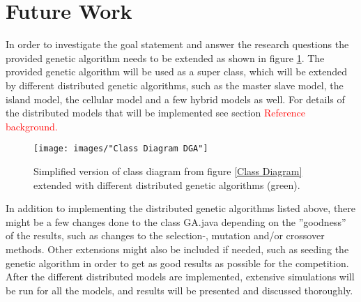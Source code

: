 \section{Future Work}


In order to investigate the goal statement and answer the research questions the provided genetic algorithm needs to be extended as shown in figure \ref{Class Diagram DGA}. The provided genetic algorithm will be used as a super class, which will be extended by different distributed genetic algorithms, such as the master slave model, the island model, the cellular model and a few hybrid models as well. For details of the distributed models that will be implemented see section \textcolor{red}{Reference background.}\\


\begin{figure}[h!]
\begin{center}
\texttt{[image: images/"Class Diagram DGA"]}
\caption{Simplified version of class diagram from figure \ref{Class Diagram} extended with different distributed genetic algorithms (green).}
\label{Class Diagram DGA}
\end{center}
\end{figure}


\noindent In addition to implementing the distributed genetic algorithms listed above, there might be a few changes done to the class GA.java depending on the ''goodness'' of the results, such as changes to the selection-, mutation and/or crossover methods. Other extensions might also be included if needed, such as seeding the genetic algorithm in order to get as good results as possible for the competition.\\

\noindent After the different distributed models are implemented, extensive simulations will be run for all the models, and results will be presented and discussed thoroughly. 

